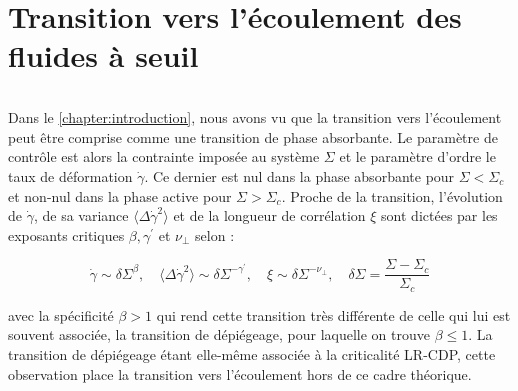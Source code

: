 \chapter{Transition vers l'écoulement des fluides à seuil}

\label{chapter:yielding}

\subparagraph{}Dans le \autoref{chapter:introduction}, nous avons vu que la transition vers l'écoulement peut être comprise comme une transition de phase absorbante. Le paramètre de contrôle est alors la contrainte imposée au système $\Sigma$ et le paramètre d'ordre le taux de déformation $\dot{\gamma}$. Ce dernier est nul dans la phase absorbante pour $\Sigma < \Sigma_c$ et non-nul dans la phase active pour $\Sigma > \Sigma_c$. Proche de la transition, l'évolution de $\dot{\gamma}$, de sa variance $\langle\Delta\dot{\gamma}^2\rangle$ et de la longueur de corrélation $\xi$ sont dictées par les exposants critiques $\beta, \gamma^\prime$ et $\nu_\perp$ selon :

\begin{equation}
	\dot{\gamma} \sim \delta\Sigma^\beta,\quad \langle\Delta\dot{\gamma}^2\rangle \sim \delta\Sigma^{-\gamma^\prime}, \quad \xi \sim \delta\Sigma^{-\nu_\perp}, \quad \delta\Sigma = \frac{\Sigma-\Sigma_c}{\Sigma_c}
\end{equation}

\noindent avec la spécificité $\beta>1$ qui rend cette transition très différente de celle qui lui est souvent associée, la transition de dépiégeage, pour laquelle on trouve $\beta \leq 1$. La transition de dépiégeage étant elle-même associée à la criticalité LR-CDP, cette observation place la transition vers l'écoulement hors de ce cadre théorique. 

